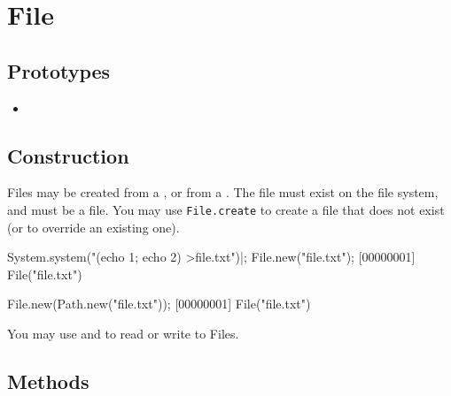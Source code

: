 \section{File}

\subsection{Prototypes}
\begin{itemize}
\item {}
\end{itemize}

\subsection{Construction}

Files may be created from a , or from a
.  The file must exist on the file system, and must be
a file.  You may use \lstinline|File.create| to create a file that
does not exist (or to override an existing one).

\begin{urbiscript}
System.system("(echo 1; echo 2) >file.txt")|;
File.new("file.txt");
[00000001] File("file.txt")

File.new(Path.new("file.txt"));
[00000001] File("file.txt")
\end{urbiscript}

You may use  and  to
read or write to Files.

\subsection{Methods}

